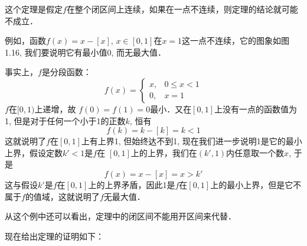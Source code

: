 \begin{rmk}
    这个定理是假定$f$在整个闭区间上连续，如果在一点不连续，则定理的结论就可能不成立．
\end{rmk}

例如，函数$f(x)=x-[x]$, $x\in [0, 1]$在$x=1$这一点不连续，它的图象如图1.16, 我们要说明它有最小值0, 而无最大值．

事实上，$f$是分段函数：
\[f(x)=\begin{cases}
    x,& 0\le x<1\\
    0,& x=1
\end{cases}\]
$f$在$[0, 1)$上递增，故
$f(0)=f(1)=0$最小．又在$[0, 1]$上没有一点的函数值为1, 但是对于任何一个小于1的正数$k$, 恒有
\[f (k) =k- [k] =k<1\]
这就说明了$f$在$[0, 1]$上有上界1, 但始终达不到1, 现在我们进一步说明1是它的最小上界，假设定数$k'<1$是$f$在
$[0, 1]$上的上界，我们在$(k',1)$内任意取一个数$x$, 于是
\[f (x) =x- [x] =x> k'\]
这与假设$k'$是$f$在$[0, 1]$上的上界矛盾，因此1是$f$在$[0, 1]$上的最小上界，但是它不属于$f$的值域，这就说明了$f$无最大值．

从这个例中还可以看出，定理中的闭区间不能用开区间来代替．

现在给出定理的证明如下：

